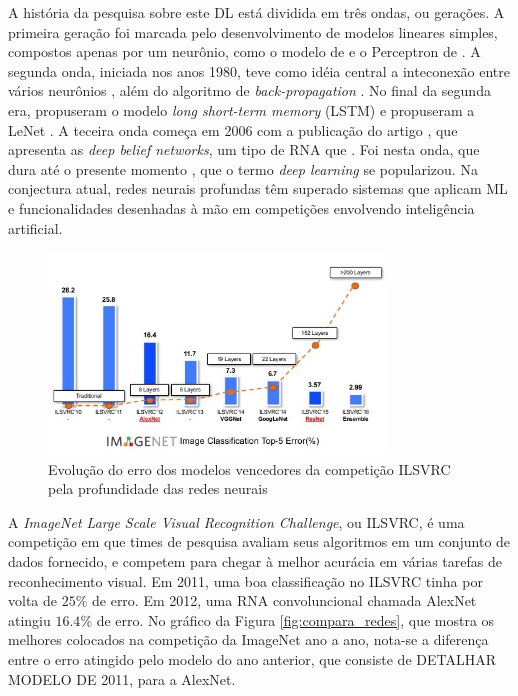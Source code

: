 A história da pesquisa sobre este DL está dividida em três ondas, ou gerações. A primeira geração foi marcada pelo desenvolvimento de modelos lineares simples, compostos apenas por um neurônio, como o modelo de \cite{mcculloch1943logical} e o Perceptron de \cite{rosenblatt1958perceptron}. A segunda onda, iniciada nos anos 1980, teve como idéia central a inteconexão entre vários neurônios \cite{rumelhart1986parallel}, além do algoritmo de \emph{back-propagation} \cite{rumelhart1986backpropagation}. No final da segunda era, \cite{hochreiter1997long} propuseram o modelo \emph{long short-term memory} (LSTM) e \cite{lenet} propuseram a LeNet . A teceira onda começa em 2006 com a publicação do artigo \cite{hinton2006fast}, que apresenta as \emph{deep belief networks}, um tipo de RNA que  . Foi nesta onda, que dura até o presente momento \cite{goodfellow2016deep}, que o termo \emph{deep learning} se popularizou. Na conjectura atual, redes neurais profundas têm superado sistemas que aplicam ML e funcionalidades desenhadas à mão em competições envolvendo inteligência artificial.

\begin{figure}[!h]
	\centering
	\includegraphics[width=0.8\textwidth]{img/compara_redes_ilsvrc.png}
	\caption{Evolução do erro dos modelos vencedores da competição ILSVRC pela profundidade das redes neurais \cite{dl_ILSVRC}}
	\label{fig:compara_redes_ilsvrc}
\end{figure}

A \emph{ImageNet Large Scale Visual Recognition Challenge}, ou ILSVRC, é uma competição em que times de pesquisa avaliam seus algoritmos em um conjunto de dados fornecido, e competem para chegar à melhor acurácia em várias tarefas de reconhecimento visual. Em 2011, uma boa classificação no ILSVRC tinha por volta de $25\%$ de erro. Em 2012, uma RNA convoluncional chamada AlexNet atingiu $16.4\%$ de erro. No gráfico da Figura \ref{fig:compara_redes}, que mostra os melhores colocados na competição da ImageNet ano a ano, nota-se a diferença entre o erro atingido pelo modelo do ano anterior, que consiste de DETALHAR MODELO DE 2011, para a AlexNet. 

